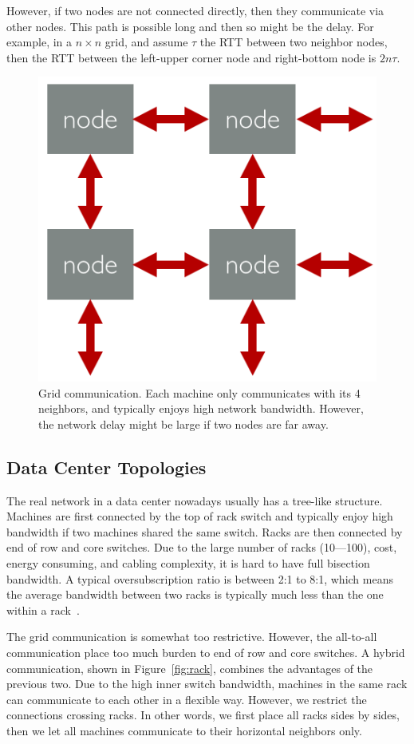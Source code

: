 \documentclass[11pt, twocolumn]{article}
\begin{document}
However, if two nodes are not connected directly, then they communicate via
other nodes. This path is possible long and then so might be the delay. For
example, in a $n\times n$ grid, and assume $\tau$ the RTT  between
two neighbor nodes, then the RTT between the left-upper corner node and
right-bottom node is $2n\tau$.

\begin{figure}[th!]
  \centering
  \includegraphics[width=.45\textwidth]{fig/grid}
  \caption{Grid communication. Each machine only communicates with its 4
    neighbors, and typically enjoys high network bandwidth. However, the network
  delay might be large if two nodes are far away.}
  \label{fig:grid2}
\end{figure}

\subsection{Data Center Topologies}

The real network in a data
center nowadays usually has a tree-like structure. Machines are first connected
by the top of rack switch and typically enjoy high bandwidth if two machines
shared the same switch. Racks are then connected by end of row and core
switches. Due to the large number of racks (10---100), cost, energy consuming,
and cabling complexity, it is hard to have full bisection bandwidth. A typical
oversubscription ratio is between 2:1 to 8:1, which means the average bandwidth
between two racks is typically much less than the one within a
rack~\cite{AlFLouVah08, BarHol09}.

The grid communication is somewhat too restrictive. However, the all-to-all
communication place too much burden to end of row and core switches. A hybrid
communication, shown in Figure~\ref{fig:rack}, combines the advantages of the
previous two. Due to the high
inner switch bandwidth, machines in the same rack can communicate to each other
in a flexible way. However, we restrict the connections crossing racks. In other
words, we first place all racks sides by sides, then we let all machines
communicate to their horizontal neighbors only.
\end{document}
